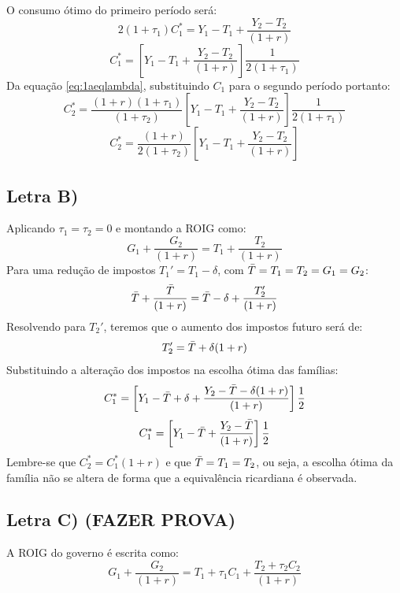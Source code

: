 \documentclass{article}
\begin{document}
O consumo ótimo do primeiro período será:
\begin{equation}
    2(1+\tau_1)C_1^* = Y_1-T_1+\frac{Y_2-T_2}{(1+r)}
\end{equation}
\begin{equation}
    C_1^* = \left[Y_1-T_1+\frac{Y_2-T_2}{(1+r)}\right]\frac{1}{2(1+\tau_1)}
\end{equation}
Da equação \eqref{eq:1aeqlambda}, substituindo $C_1$ para o segundo período portanto:
\begin{equation}
    C_2^*=\frac{(1+r)(1+\tau_1)}{(1+\tau_2)}\left[Y_1-T_1+\frac{Y_2-T_2}{(1+r)}\right]\frac{1}{2(1+\tau_1)}
\end{equation}
\begin{equation}
    C_2^*=\frac{(1+r)}{2(1+\tau_2)}\left[Y_1-T_1+\frac{Y_2-T_2}{(1+r)}\right]
\end{equation}
\subsection*{Letra B)}
Aplicando $\tau_1=\tau_2=0$ e montando a ROIG como:
\begin{equation}
    G_1 + \frac{G_2}{(1+r)} = T_1 + \frac{T_2}{(1+r)}
\end{equation}
Para uma redução de impostos $T_1'=T_1-\delta$, com $\Bar{T}=T_1=T_2=G_1=G_2$:
\begin{equation}
    \Bar{T} + \frac{\Bar{T}}{(1+r)} = \Bar{T}-\delta + \frac{T_2'}{(1+r)}
\end{equation}
Resolvendo para $T_2'$, teremos que o aumento dos impostos futuro será de:
\begin{equation}
    T_2'=\Bar{T}+\delta(1+r)
\end{equation}
Substituindo a alteração dos impostos na escolha ótima das famílias:
\begin{equation}
    C_1^* = \left[Y_1-\bar{T}+\delta+\frac{Y_2-\Bar{T}-\delta(1+r)}{(1+r)}\right]\frac{1}{2}
\end{equation}
\begin{equation}
    C_1^* = \left[Y_1-\bar{T}+\frac{Y_2-\Bar{T}}{(1+r)}\right]\frac{1}{2}
\end{equation}
Lembre-se que $C_2^*=C_1^*(1+r)$ e que $\Bar{T}=T_1=T_2$, ou seja, a escolha ótima da família não se altera de forma que a equivalência ricardiana é observada.
\subsection*{Letra C) (FAZER PROVA)}
A ROIG do governo é escrita como:
\begin{equation}
    G_1 + \frac{G_2}{(1+r)}=T_1+\tau_1 C_1 + \frac{T_2+\tau_2 C_2}{(1+r)}
\end{equation}
\end{document}
